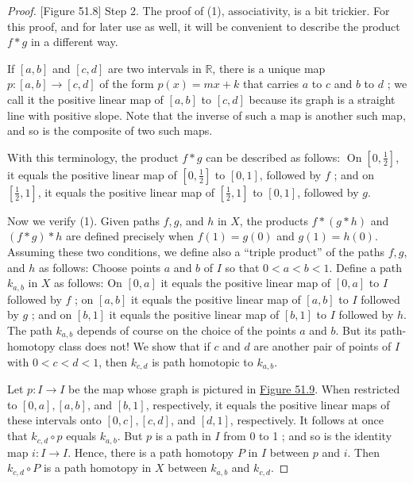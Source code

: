 \begin{proof}
[Figure 51.8]
Step 2. The proof of (1), associativity, is a bit trickier. For this proof, and for later use as well, it will be convenient to describe the product \(f * g\) in a different way.

If \([ {a,b}]\) and \([ {c,d}]\) are two intervals in \(\mathbb{R}\), there is a unique map \(p : [ {a,b}] \rightarrow [ {c,d}]\) of the form \(p(x) = {mx} + k\) that carries \(a\) to \(c\) and \(b\) to \(d\) ; we call it the positive linear map of \([ {a,b}]\) to \([ {c,d}]\) because its graph is a straight line with positive slope. Note that the inverse of such a map is another such map, and so is the composite of two such maps.

With this terminology, the product \(f * g\) can be described as follows: \(\operatorname{On}[ {0,\frac{1}{2}}]\), it equals the positive linear map of \([ {0,\frac{1}{2}}]\) to \([ {0,1}]\), followed by \(f\) ; and on \([ {\frac{1}{2},1}]\), it equals the positive linear map of \([ {\frac{1}{2},1}]\) to \([ {0,1}]\), followed by \(g\).

Now we verify (1). Given paths \(f,g\), and \(h\) in \(X\), the products \(f * ( {g * h})\) and \(( {f * g}) * h\) are defined precisely when \(f(1) = g( 0)\) and \(g(1) = h( 0)\). Assuming these two conditions, we define also a ``triple product'' of the paths \(f,g\), and \(h\) as follows: Choose points \(a\) and \(b\) of \(I\) so that \(0 < a < b < 1\). Define a path \(k_{a,b}\) in \(X\) as follows: On \([ {0,a}]\) it equals the positive linear map of \([ {0,a}]\) to \(I\) followed by \(f\) ; on \([ {a,b}]\) it equals the positive linear map of \([ {a,b}]\) to \(I\) followed by \(g\) ; and on \([ {b,1}]\) it equals the positive linear map of \([ {b,1}]\) to \(I\) followed by \(h\). The path \(k_{a,b}\) depends of course on the choice of the points \(a\) and \(b\). But its path-homotopy class does not! We show that if \(c\) and \(d\) are another pair of points of \(I\) with \(0 < c < d < 1\), then \(k_{c,d}\) is path homotopic to \(k_{a,b}\).

Let \(p : I \rightarrow I\) be the map whose graph is pictured in \hyperref[fig:51.9]{Figure 51.9}. When restricted to \([ {0,a}] ,[ {a,b}]\), and \([ {b,1}]\), respectively, it equals the positive linear maps of these intervals onto \([ {0,c}] ,[ {c,d}]\), and \([ {d,1}]\), respectively. It follows at once that \(k_{c,d} \circ p\) equals \(k_{a,b}\). But \(p\) is a path in \(I\) from 0 to 1 ; and so is the identity map \(i : I \rightarrow I\). Hence, there is a path homotopy \(P\) in \(I\) between \(p\) and \(i\). Then \(k_{c,d} \circ P\) is a path homotopy in \(X\) between \(k_{a,b}\) and \(k_{c,d}\).


\end{proof}
